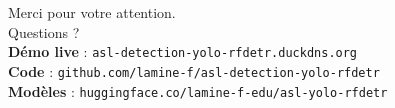 \documentclass[11pt,aspectratio=169]{beamer}
\begin{document}
\begin{frame}[standout]
  Merci pour votre attention.\\[10pt]
  \large Questions ?\\[20pt]
  \footnotesize
  \textcolor{espgold}{\textbf{Démo live}} : \texttt{asl-detection-yolo-rfdetr.duckdns.org}\\
  \textcolor{espgold}{\textbf{Code}} : \texttt{github.com/lamine-f/asl-detection-yolo-rfdetr}\\
  \textcolor{espgold}{\textbf{Modèles}} : \texttt{huggingface.co/lamine-f-edu/asl-yolo-rfdetr}
\end{frame}
\end{document}
